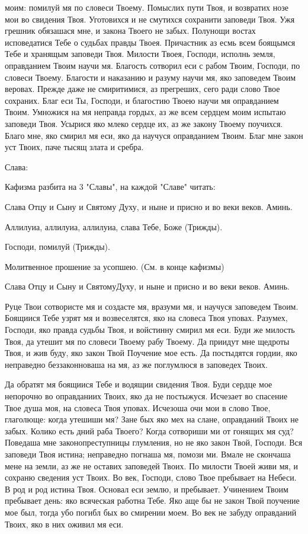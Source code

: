моим: помилуй мя по словеси Твоему. Помыслих пути Твоя, и возвратих нозе мои во свидения Твоя. Уготовихся и не смутихся сохранити заповеди Твоя. Ужя грешник обязашася мне, и закона Твоего не забых. Полунощи востах исповедатися Тебе о судьбах правды Твоея. Причастник аз есмь всем боящымся Тебе и хранящым заповеди Твоя. Милости Твоея, Господи, исполнь земля, оправданием Твоим научи мя. Благость сотворил еси с рабом Твоим, Господи, по словеси Твоему. Благости и наказанию и разуму научи мя, яко заповедем Твоим веровах. Прежде даже не смиритимися, аз прегреших, сего ради слово Твое сохраних. Благ еси Ты, Господи, и благостию Твоею научи мя оправданием Твоим. Умножися на мя неправда гордых, аз же всем сердцем моим испытаю заповеди Твоя. Усырися яко млеко сердце их, аз же закону Твоему поучихся. Благо мне, яко смирил мя еси, яко да научуся оправданием Твоим. Благ мне закон уст Твоих, паче тысящ злата и сребра. 

Слава: 

Кафизма разбита на 3 "Славы", на каждой "Славе" читать: 

Слава Отцу и Сыну и Святому Духу, и ныне и присно и во веки веков. Аминь. 

Аллилуиа, аллилуиа, аллилуиа, слава Тебе, Боже (Трижды). 

Господи, помилуй (Трижды). 

Молитвенное прошение за усопшею. (См. в конце кафизмы) 

Слава Отцу и Сыну и СвятомуДуху, и ныне и присно и во веки веков. Аминь. 

Руце Твои сотвористе мя и создасте мя, вразуми мя, и научуся заповедем Твоим. Боящиися Тебе узрят мя и возвеселятся, яко на словеса Твоя уповах. Разумех, Господи, яко правда судьбы Твоя, и войстинну смирил мя еси. Буди же милость Твоя, да утешит мя по словеси Твоему рабу Твоему. Да приидут мне щедроты Твоя, и жив буду, яко закон Твой Поучение мое есть. Да постыдятся гордии, яко неправедно беззаконноваша на мя, аз же поглумлюся в заповедех Твоих. 

Да обратят мя боящиися Тебе и водящии свидения Твоя. Буди сердце мое непорочно во оправданиих Твоих, яко да не постыжуся. Исчезает во спасение Твое душа моя, на словеса Твоя уповах. Исчезоша очи мои в слово Твое, глаголюще: когда утешиши мя? Зане бых яко мех на слане, оправданий Твоих не забых. Колико есть дний раба Твоего? Когда сотвориши ми от гонящих мя суд? Поведаша мне законопреступницы глумления, но не яко закон Твой, Господи. Вся заповеди Твоя истина; неправедно погнаша мя, помози ми. Вмале не скончаша мене на земли, аз же не оставих заповедей Твоих. По милости Твоей живи мя, и сохраню сведения уст Твоих. Во век, Господи, слово Твое пребывает на Небеси. В род и род истина Твоя. Основал еси землю, и пребывает. Учинением Твоим пребывает день: яко всяческая работна Тебе. Яко аще бы не закон Твой поучение мое был, тогда убо погибл бых во смирении моем. Во век не забуду оправданий Твоих, яко в них оживил мя еси. 

